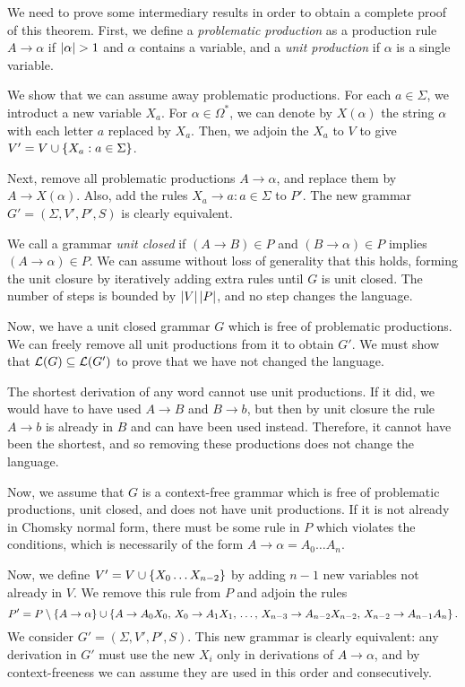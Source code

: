 \documentclass{article}
\begin{document}
\begin{prf}
	We need to prove some intermediary results in order to obtain a complete proof of this theorem. First, we define a \textit{problematic production} as a production rule $A \to \alpha$ if $\left\lvert \alpha \right\rvert > 1$ and $\alpha$ contains a variable, and a \textit{unit production} if $\alpha$ is a single variable.
	    
	We show that we can assume away problematic productions. For each $a \in \Sigma$, we introduct a new variable $X_a$. For $\alpha \in \Omega^*$, we can denote by $X(\alpha)$ the string $\alpha$ with each letter $a$ replaced by $X_a$. Then, we adjoin the $X_a$ to $V$ to give $V' = V \cup \left\lbrace X_a : a \in \Sigma \right\rbrace$.
	    
	Next, remove all problematic productions $A \to \alpha$, and replace them by $A \to X(\alpha)$. Also, add the rules $X_a \to a: a \in \Sigma$ to $P'$. The new grammar $G' = (\Sigma, V', P', S)$ is clearly equivalent.
	    
	We call a grammar \textit{unit closed} if $(A \to B) \in P$ and $(B \to \alpha) \in P$ implies $(A \to \alpha) \in P$. We can assume without loss of generality that this holds, forming the unit closure by iteratively adding extra rules until $G$ is unit closed. The number of steps is bounded by $\left\lvert V \right\rvert \left\lvert P \right\rvert$, and no step changes the language.
	    
	Now, we have a unit closed grammar $G$ which is free of problematic productions. We can freely remove all unit productions from it to obtain $G'$. We must show that $\mathcal{L}(G) \subseteq \mathcal{L}(G')$ to prove that we have not changed the language.
	    
	The shortest derivation of any word cannot use unit productions. If it did, we would have to have used $A \to B$ and $B \to b$, but then by unit closure the rule $A \to b$ is already in $B$ and can have been used instead. Therefore, it cannot have been the shortest, and so removing these productions does not change the language.
	    
	Now, we assume that $G$ is a context-free grammar which is free of problematic productions, unit closed, and does not have unit productions. If it is not already in Chomsky normal form, there must be some rule in $P$ which violates the conditions, which is necessarily of the form $A \to \alpha = A_0 \dots A_n$.
	    
	Now, we define $V' = V \cup \left\lbrace X_0 \dots X_{n-2} \right\rbrace$ by adding $n-1$ new variables not already in $V$. We remove this rule from $P$ and adjoin the rules
	\[
		P' = P \setminus \left\lbrace A \to \alpha \right\rbrace \cup \left\lbrace A \to A_0X_0, \, X_0 \to A_1X_1, \, \dots , \, X_{n-3} \to A_{n-2}X_{n-2}, \, X_{n-2} \to A_{n-1} A_n \right\rbrace.
	\]
	We consider $G' = (\Sigma, V', P', S)$. This new grammar is clearly equivalent: any derivation in $G'$ must use the new $X_i$ only in derivations of $A \to \alpha$, and by context-freeness we can assume they are used in this order and consecutively.
		

\end{prf}
\end{document}
